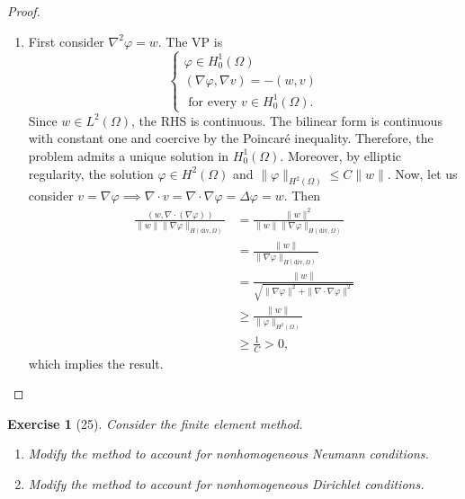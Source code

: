 \documentclass[letterpaper,twoside,11pt]{article}
\theoremstyle{mystyle}
\newtheorem*{exercise}{Exercise}
\newcommand{\cbk}{\color{black}}
\newcommand{\Hdiv}{H\left( \text{div}, \Omega \right)}
\newcommand{\Ltwo}{L^2 \left( \Omega \right)}
\begin{document}
\begin{proof}
\begin{enumerate}
    \item First consider $\nabla^2\varphi = w$. The VP is 
    \[\left\{ {\begin{array}{*{20}{l}}
      \varphi \in H_0^1 \left( \Omega \right)\\[.2cm]
      \left( \nabla \varphi, \nabla v \right) = - \left( w, v \right)\\[.2cm]
      \text{ for every } v \in H_0^1 \left( \Omega \right).
    \end{array}} \right.\]
    Since $w \in \Ltwo$, the RHS is continuous. The bilinear form is continuous with constant one and coercive by the Poincar\'e inequality. Therefore, the problem admits a unique solution in $H_0^1(\Omega)$. Moreover, by elliptic regularity, the solution \(\varphi \in H^2 \left( \Omega \right)\) and $\|\varphi\|_{H^2(\Omega)} \leq C \|w\|$.
    Now, let us consider $v = \nabla \varphi \implies \nabla \cdot v = \nabla \cdot \nabla \varphi = \Delta \varphi = w$. Then 
    \begin{align*}
      \frac{(w, \nabla \cdot (\nabla \varphi))}{\|w\| \|\nabla \varphi\|_{\Hdiv}}&=\frac{\|w\|^2 }{\|w\| \|\nabla \varphi\|_{\Hdiv}}\\[.2cm] 
      &= \frac{\|w\|}{\|\nabla \varphi\|_{\Hdiv}}\\[.2cm]
      &= \frac{\|w\|}{\sqrt{\|\nabla \varphi \|^2 + \|\nabla \cdot \nabla \varphi \|^2 }}\\[.2cm]
      &\geq \frac{\|w\|}{\|\varphi\|_{H^2 (\Omega)}}\\[.2cm]
      &\geq \frac{1}{C} > 0,
    \end{align*}
    which implies the result. 

  \end{enumerate}
\end{proof}
\cbk 




\newpage 
\begin{exercise}[25] 
  Consider the finite element method. 
  \begin{enumerate}
    \item Modify the method to account for nonhomogeneous Neumann conditions. 
    \item Modify the method to account for nonhomogeneous Dirichlet conditions. 
  \end{enumerate}
\end{exercise}
\end{document}
